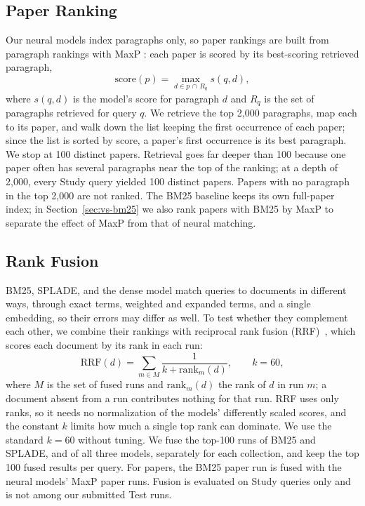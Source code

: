 \documentclass[sigconf,nonacm]{acmart}
\begin{document}
\subsection{Paper Ranking}
\label{sec:maxp}
Our neural models index paragraphs only, so paper rankings are built from
paragraph rankings with MaxP \cite{dai2019deeper}: each paper is scored by
its best-scoring retrieved paragraph,
\begin{equation}
    \text{score}(p) = \max_{d \in p \,\cap\, R_q} s(q, d),
\end{equation}
where $s(q,d)$ is the model's score for paragraph $d$ and $R_q$ is the set
of paragraphs retrieved for query $q$. We retrieve the top 2,000 paragraphs,
map each to its paper, and walk down the list keeping the first occurrence
of each paper; since the list is sorted by score, a paper's first occurrence
is its best paragraph. We stop at 100 distinct papers. Retrieval goes far
deeper than 100 because one paper often has several paragraphs near the top
of the ranking; at a depth of 2,000, every Study query yielded 100 distinct
papers. Papers with no paragraph in the top 2,000 are not ranked.
The BM25 baseline keeps its own full-paper index; in
Section~\ref{sec:vs-bm25} we also rank papers with BM25 by MaxP to separate
the effect of MaxP from that of neural matching.

\subsection{Rank Fusion}
\label{sec:rrf}
BM25, SPLADE, and the dense model match queries to documents in different ways, 
through exact terms, weighted and expanded terms, and a single embedding, so their 
errors may differ as well. To test whether they complement each other, we combine 
their rankings with reciprocal rank fusion (RRF)~\cite{cormack2009reciprocal}, 
which scores each document by its rank in each run:
\begin{equation}
  \mathrm{RRF}(d) = \sum_{m \in M} \frac{1}{k + \mathrm{rank}_m(d)},
  \qquad k = 60,
  \label{eq:rrf}
\end{equation}
where $M$ is the set of fused runs and $\mathrm{rank}_m(d)$ the rank of $d$ in 
run $m$; a document absent from a run contributes nothing for that run. RRF uses 
only ranks, so it needs no normalization of the models' differently scaled 
scores, and the constant $k$ limits how much a single top rank can dominate. We 
use the standard $k = 60$ without tuning. We fuse the top-100 runs of BM25 and 
SPLADE, and of all three models, separately for each collection, and keep the 
top 100 fused results per query. For papers, the BM25 paper run is fused with 
the neural models' MaxP paper runs. Fusion is evaluated on Study queries only 
and is not among our submitted Test runs.
\end{document}
